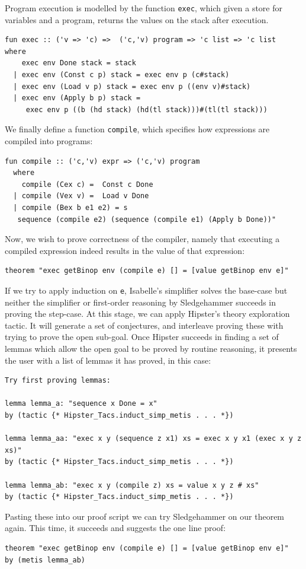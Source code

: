Program execution is modelled by the function \texttt{exec}, which given a store for variables and a program, returns the values on the stack after execution.
\begin{small}
\begin{verbatim}
fun exec :: ('v => 'c) =>  ('c,'v) program => 'c list => 'c list
where
    exec env Done stack = stack
  | exec env (Const c p) stack = exec env p (c#stack)
  | exec env (Load v p) stack = exec env p ((env v)#stack)
  | exec env (Apply b p) stack =
     exec env p ((b (hd stack) (hd(tl stack)))#(tl(tl stack)))
\end{verbatim}
\end{small}
We finally define a function \texttt{compile}, which specifies how expressions are compiled into programs:
\begin{small}
\begin{verbatim}
fun compile :: ('c,'v) expr => ('c,'v) program
  where
    compile (Cex c) =  Const c Done
  | compile (Vex v) =  Load v Done
  | compile (Bex b e1 e2) = s
   sequence (compile e2) (sequence (compile e1) (Apply b Done))"
\end{verbatim}
\end{small}
Now, we wish to prove correctness of the compiler, namely that executing a compiled expression indeed results in the value of that expression: 
\begin{verbatim}
theorem "exec getBinop env (compile e) [] = [value getBinop env e]"
\end{verbatim}
If we try to apply induction on \texttt{e}, Isabelle's simplifier solves the base-case but neither the simplifier or first-order reasoning by Sledgehammer succeeds in proving the step-case. At this stage, we can apply Hipster's theory exploration tactic. It will generate a set of conjectures, and interleave proving these with trying to prove the open sub-goal. Once Hipster succeeds in finding a set of lemmas which allow the open goal to be proved by routine reasoning, it presents the user with a list of lemmas it has proved, in this case:
\begin{small}
\begin{verbatim}
Try first proving lemmas:

lemma lemma_a: "sequence x Done = x"
by (tactic {* Hipster_Tacs.induct_simp_metis . . . *})

lemma lemma_aa: "exec x y (sequence z x1) xs = exec x y x1 (exec x y z xs)"
by (tactic {* Hipster_Tacs.induct_simp_metis . . . *})

lemma lemma_ab: "exec x y (compile z) xs = value x y z # xs"
by (tactic {* Hipster_Tacs.induct_simp_metis . . . *})
\end{verbatim}
\end{small}
Pasting these into our proof script we can try Sledgehammer on our theorem again. This time, it succeeds and suggests the one line proof:%
\begin{verbatim}
theorem "exec getBinop env (compile e) [] = [value getBinop env e]"
by (metis lemma_ab)
\end{verbatim}

